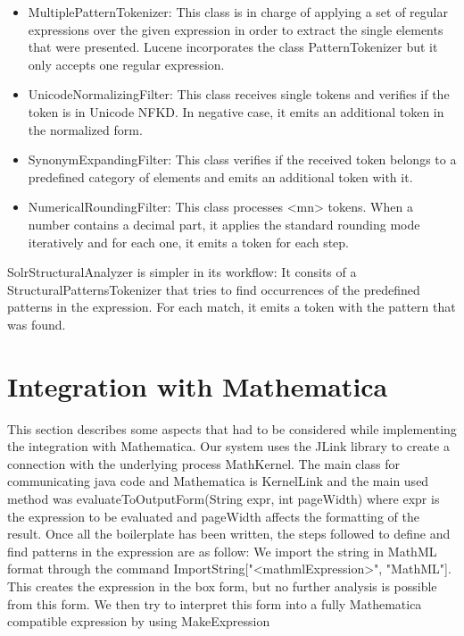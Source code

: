 \begin{itemize}
\item {\codefont MultiplePatternTokenizer}: This class is in charge of applying a set of regular expressions over the given expression in order to extract the single elements that were presented. Lucene incorporates the class {\codefont PatternTokenizer} but it only accepts one regular expression.
\item {\codefont UnicodeNormalizingFilter}: This class receives single tokens and verifies if the token is in Unicode NFKD. In negative case, it emits an additional token in the normalized form.
\item {\codefont SynonymExpandingFilter}: This class verifies if the received token belongs to a predefined category of elements and emits an additional token with it.
\item {\codefont NumericalRoundingFilter}: This class processes {\codefont <mn>} tokens. When a number contains a decimal part, it applies the standard rounding mode iteratively and for each one, it emits a token for each step. 
\end{itemize}

{\codefont SolrStructuralAnalyzer } is simpler in its workflow: It consits of a {\codefont StructuralPatternsTokenizer} that tries to find occurrences of the predefined patterns in the expression. For each match, it emits a token with the pattern that was found. 

\section{Integration with Mathematica}
This section describes some aspects that had to be considered while implementing the integration with Mathematica. Our system uses the {\codefont JLink} library to create a connection with the underlying process {\codefont MathKernel}. The main class for communicating java code and {\codefont Mathematica} is {\codefont KernelLink} and the main used method was {\codefont evaluateToOutputForm(String expr, int pageWidth)} where {\codefont expr} is the expression to be evaluated and {\codefont pageWidth} affects the formatting of the result.
Once all the boilerplate has been written, the steps followed to define and find patterns in the expression are as follow: We import the string in MathML format through the command {\codefont ImportString["<mathmlExpression>", "MathML"]}. This creates the expression in the box form, but no further analysis is possible from this form. We then try to interpret this form into a fully Mathematica compatible expression by using {\codefont MakeExpression}


